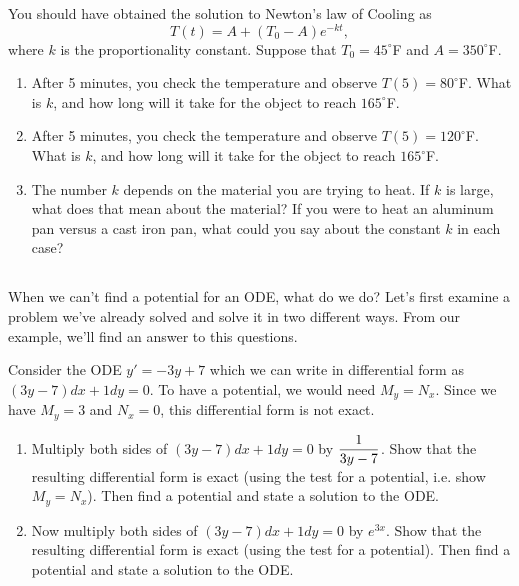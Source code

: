 \begin{problem}
 You should have obtained the solution to Newton's law of Cooling as $$T(t) = A+(T_0-A)e^{-kt},$$ where $k$ is the proportionality constant. Suppose that $T_0=45^\circ$F and $A=350^\circ$F.  
\begin{enumerate}
 \item After 5 minutes, you check the temperature and observe $T(5)=80^\circ$F.  What is $k$, and how long will it take for the object to reach $165^\circ$F. 
 \item After 5 minutes, you check the temperature and observe $T(5)=120^\circ$F.  What is $k$, and how long will it take for the object to reach $165^\circ$F. 
 \item The number $k$ depends on the material you are trying to heat.  If $k$ is large, what does that mean about the material? If you were to heat an aluminum pan versus a cast iron pan, what could you say about the constant $k$ in each case?
\end{enumerate}
\end{problem}





\subsection*{\ideaB}
When we can't find a potential for an ODE, what do we do?  Let's first examine a problem we've already solved and solve it in two different ways. From our example, we'll find an answer to this questions.


\begin{problem}\label{integrating factor introduction}
 Consider the ODE $y'=-3y+7$ which we can write in differential form as $(3y-7)dx+1dy=0.$  To have a potential, we would need $M_y=N_x$.
 Since we have $M_y=3$ and $N_x=0$, this differential form is not exact.  
\begin{enumerate}
 \item Multiply both sides of  $(3y-7)dx+1dy=0$ by $\displaystyle\frac{1}{3y-7}$. Show that the resulting differential form is exact (using the test for a potential, i.e. show $M_y=N_x$). Then find a potential and state a solution to the ODE.
 \item 
Now multiply both sides of $(3y-7)dx+1dy=0$ by $e^{3x}$. Show that the resulting differential form is exact (using the test for a potential). Then find a potential and state a solution to the ODE.
\end{enumerate}
\end{problem}

